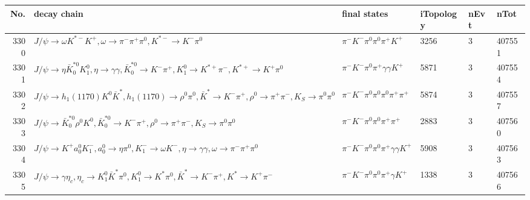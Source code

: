 \begin{table}[htbp] 
\begin{center}
\begin{small}
\begin{tabular}{rlllll}\hline\hline
 No. & decay chain & final states &  iTopology & nEvt & nTot \\\hline
3300&$J/\psi       \rightarrow \omega         K^{*-}         K^{+}          , \omega          \rightarrow \pi^{-}        \pi^{+}        \pi^{0}        , K^{*-}          \rightarrow K^{-}          \pi^{0}        $&$\pi^{-}        K^{-}          \pi^{0}        \pi^{0}        \pi^{+}        K^{+}          $& 3256&    3&407551\\
3301&$J/\psi       \rightarrow \eta          \bar{K}_0^{*0}K_1^{0}        , \eta           \rightarrow \gamma       \gamma       , \bar{K}_0^{*0} \rightarrow K^{-}          \pi^{+}        , K_1^{0}         \rightarrow K^{*+}         \pi^{-}        , K^{*+}          \rightarrow K^{+}          \pi^{0}        $&$\pi^{-}        K^{-}          \pi^{0}        \pi^{+}        \gamma       \gamma       K^{+}          $& 5871&    3&407554\\
3302&$J/\psi       \rightarrow h_{1}(1170)    K^{0}          \bar{K}^{*}   , h_{1}(1170)     \rightarrow \rho^{0}      \pi^{0}        , \bar{K}^{*}    \rightarrow K^{-}          \pi^{+}        , \rho^{0}       \rightarrow \pi^{+}        \pi^{-}        , K_{S}           \rightarrow \pi^{0}        \pi^{0}        $&$\pi^{-}        K^{-}          \pi^{0}        \pi^{0}        \pi^{0}        \pi^{+}        \pi^{+}        $& 5874&    3&407557\\
3303&$J/\psi       \rightarrow \bar{K}_0^{*0}\rho^{0}      K^{0}          , \bar{K}_0^{*0} \rightarrow K^{-}          \pi^{+}        , \rho^{0}       \rightarrow \pi^{+}        \pi^{-}        , K_{S}           \rightarrow \pi^{0}        \pi^{0}        $&$\pi^{-}        K^{-}          \pi^{0}        \pi^{0}        \pi^{+}        \pi^{+}        $& 2883&    3&407560\\
3304&$J/\psi       \rightarrow K^{+}          a_{0}^{0}      K_{1}^{-}      , a_{0}^{0}       \rightarrow \eta          \pi^{0}        , K_{1}^{-}       \rightarrow \omega         K^{-}          , \eta           \rightarrow \gamma       \gamma       , \omega          \rightarrow \pi^{-}        \pi^{+}        \pi^{0}        $&$\pi^{-}        K^{-}          \pi^{0}        \pi^{0}        \pi^{+}        \gamma       \gamma       K^{+}          $& 5908&    3&407563\\
3305&$J/\psi       \rightarrow \gamma       \eta_{c}    , \eta_{c}     \rightarrow K_1^{0}        \bar{K}^{*}   \pi^{0}        , K_1^{0}         \rightarrow K^{*}          \pi^{0}        , \bar{K}^{*}    \rightarrow K^{-}          \pi^{+}        , K^{*}           \rightarrow K^{+}          \pi^{-}        $&$\pi^{-}        K^{-}          \pi^{0}        \pi^{0}        \pi^{+}        \gamma       K^{+}          $& 1338&    3&407566\\

\end{tabular}
\end{small}
\end{center}
\end{table}
